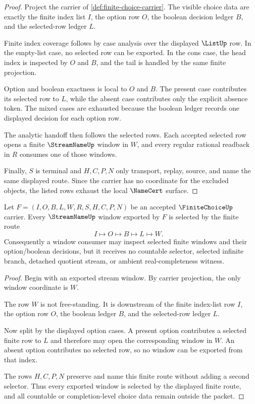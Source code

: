 \begin{proof}
Project the carrier of \autoref{def:finite-choice-carrier}. The visible choice data are exactly the finite index list $I$, the option row $O$, the boolean decision ledger $B$, and the selected-row ledger $L$.

Finite index coverage follows by case analysis over the displayed $\ListUp$ row. In the empty-list case, no selected row can be exported. In the cons case, the head index is inspected by $O$ and $B$, and the tail is handled by the same finite projection.

Option and boolean exactness is local to $O$ and $B$. The present case contributes its selected row to $L$, while the absent case contributes only the explicit absence token. The mixed cases are exhausted because the boolean ledger records one displayed decision for each option row.

The analytic handoff then follows the selected rows. Each accepted selected row opens a finite $\StreamNameUp$ window in $W$, and every regular rational readback in $R$ consumes one of those windows.

Finally, $S$ is terminal and $H,C,P,N$ only transport, replay, source, and name the same displayed route. Since the carrier has no coordinate for the excluded objects, the listed rows exhaust the local $\NameCert$ surface.
\end{proof}

\begin{theorem}
\label{thm:finite-choice-window-selection-boundary}
Let $F=(I,O,B,L,W,R,S,H,C,P,N)$ be an accepted $\FiniteChoiceUp$ carrier. Every $\StreamNameUp$ window exported by $F$ is selected by the finite route
$$
I \longmapsto O \longmapsto B \longmapsto L \longmapsto W .
$$
Consequently a window consumer may inspect selected finite windows and their option/boolean decisions, but it receives no countable selector, selected infinite branch, detached quotient stream, or ambient real-completeness witness.
\end{theorem}
\begin{proof}
Begin with an exported stream window. By carrier projection, the only window coordinate is $W$.

The row $W$ is not free-standing. It is downstream of the finite index-list row $I$, the option row $O$, the boolean ledger $B$, and the selected-row ledger $L$.

Now split by the displayed option cases. A present option contributes a selected finite row to $L$ and therefore may open the corresponding window in $W$. An absent option contributes no selected row, so no window can be exported from that index.

The rows $H,C,P,N$ preserve and name this finite route without adding a second selector. Thus every exported window is selected by the displayed finite route, and all countable or completion-level choice data remain outside the packet.
\end{proof}

